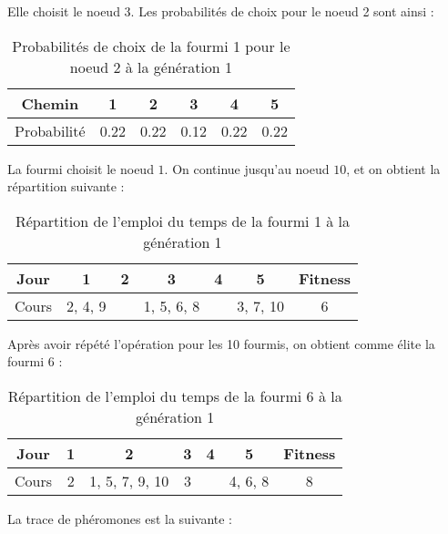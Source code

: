 Elle choisit le noeud $3$. Les probabilités de choix pour le noeud 2 sont ainsi : 

\begin{table}[h!]
    \centering
    \begin{tabular}{|c|c|c|c|c|c|}
        \hline
        Chemin & 1       & 2       & 3       & 4       & 5        \\
        \hline
        Probabilité     & 0.22 & 0.22 & 0.12 & 0.22 & 0.22 \\
        \hline
    \end{tabular}
    \caption{Probabilités de choix de la fourmi 1 pour le noeud 2 à la génération 1}\label{tab:voeux-etudiant}
\end{table}

La fourmi choisit le noeud $1$. On continue jusqu'au noeud $10$, et on obtient la répartition suivante :

\begin{table}[H]
    \centering
    \begin{tabular}{|c|c|c|c|c|c|c|}
        \hline
        Jour & 1       & 2       & 3       & 4       & 5        & Fitness\\
        \hline
        Cours & 2, 4, 9 &  & 1, 5, 6, 8 & & 3, 7, 10 & 6\\
        \hline
    \end{tabular}
    \caption{Répartition de l'emploi du temps de la fourmi 1 à la génération 1}\label{tab:voeux-etudiant}
\end{table}

Après avoir répété l'opération pour les 10 fourmis, on obtient comme élite la fourmi 6 :

\begin{table}[!h]
    \centering
    \begin{tabular}{|c|c|c|c|c|c|c|}
        \hline
        Jour & 1       & 2       & 3       & 4       & 5        & Fitness       \\
        \hline
        Cours     & 2 & 1, 5, 7, 9, 10 & 3 & & 4, 6, 8 & 8\\
        \hline
    \end{tabular}
    \caption{Répartition de l'emploi du temps de la fourmi 6 à la génération 1}\label{tab:voeux-etudiant}
\end{table}

La trace de phéromones est la suivante :

